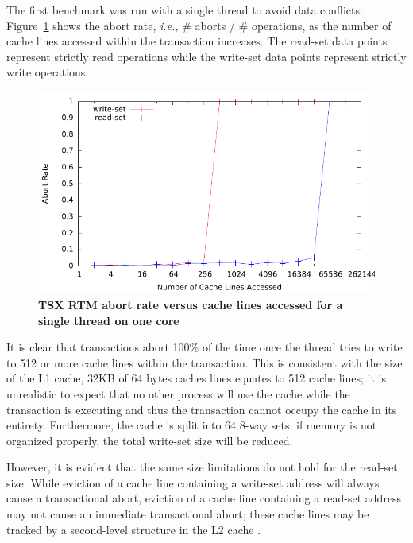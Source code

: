 \documentclass[11pt]{book}
\begin{document}
The first benchmark was run with a single thread to avoid data conflicts.
Figure~\ref{fig:trx_size} shows the abort rate, \emph{i.e.,} \# aborts / \# operations, as the
number of cache lines accessed within the transaction increases.  The read-set data points
represent strictly read operations while the write-set data points represent strictly
write operations.

\begin{figure}[H]
    \centering
    \graphicspath{ {./figures/} }
    \includegraphics[totalheight=0.50\textheight,keepaspectratio]{trxSize_singleThread}
    \caption{\textbf{TSX RTM abort rate versus cache lines accessed for a single
    thread on one core}}
    \label{fig:trx_size}
\end{figure}

It is clear that transactions abort 100\% of the time once the thread tries to write to
512 or more cache lines within the transaction.  This is consistent with the size of the
L1 cache, 32KB of 64 bytes caches lines equates to 512 cache lines; it is unrealistic to
expect that no other process will use the cache while the transaction is executing and
thus the transaction cannot occupy the cache in its entirety.  Furthermore, the cache is
split into 64 8-way sets; if memory is not organized properly, the total write-set size
will be reduced.

However, it is evident that the same size limitations do not hold for the read-set size.
While eviction of a cache line containing a write-set address will always cause a
transactional abort, eviction of a cache line containing a read-set address may not cause
an immediate transactional abort; these cache lines may be tracked by a second-level
structure in the L2 cache \cite{intel_opt_man}.
\end{document}

